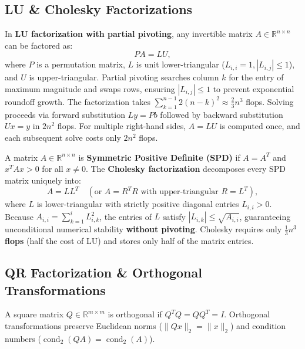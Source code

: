 \subsection{LU \& Cholesky Factorizations}

In \textbf{LU factorization with partial pivoting}, any invertible matrix $A \in \mathbb{R}^{n \times n}$ can be factored as:
\begin{equation}
    P A = L U,
\end{equation}
where $P$ is a permutation matrix, $L$ is unit lower-triangular ($L_{i,i} = 1, |L_{i,j}| \le 1$), and $U$ is upper-triangular. Partial pivoting searches column $k$ for the entry of maximum magnitude and swaps rows, ensuring $|L_{i,j}| \le 1$ to prevent exponential roundoff growth. The factorization takes $\sum_{k=1}^{n-1} 2(n-k)^2 \approx \frac{2}{3}n^3$ flops. Solving proceeds via forward substitution $L y = P b$ followed by backward substitution $U x = y$ in $2n^2$ flops. For multiple right-hand sides, $A = LU$ is computed once, and each subsequent solve costs only $2n^2$ flops.

A matrix $A \in \mathbb{R}^{n \times n}$ is \textbf{Symmetric Positive Definite (SPD)} if $A = A^T$ and $x^T A x > 0$ for all $x \neq 0$. The \textbf{Cholesky factorization} decomposes every SPD matrix uniquely into:
\begin{equation}
    A = L L^T \quad (\text{or } A = R^T R \text{ with upper-triangular } R = L^T),
\end{equation}
where $L$ is lower-triangular with strictly positive diagonal entries $L_{i,i} > 0$. Because $A_{i,i} = \sum_{k=1}^i L_{i,k}^2$, the entries of $L$ satisfy $|L_{i,k}| \le \sqrt{A_{i,i}}$, guaranteeing unconditional numerical stability \textbf{without pivoting}. Cholesky requires only \textbf{$\frac{1}{3}n^3$ flops} (half the cost of LU) and stores only half of the matrix entries.

\subsection{QR Factorization \& Orthogonal Transformations}

A square matrix $Q \in \mathbb{R}^{m \times m}$ is orthogonal if $Q^T Q = Q Q^T = I$. Orthogonal transformations preserve Euclidean norms ($\|Q x\|_2 = \|x\|_2$) and condition numbers ($\operatorname{cond}_2(Q A) = \operatorname{cond}_2(A)$).

